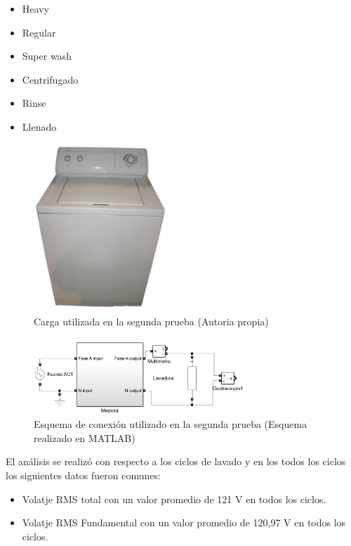 \begin{itemize}
  \itemsep0em
  \item Heavy
  \item Regular
  \item Super wash
  \item Centrifugado
  \item Rinse
  \item Llenado
\end{itemize}
\begin{figure}[H]
  \begin{center}
      \includegraphics[width = 5cm]{4Resultados/lavadora2.png}
      \caption{ Carga utilizada en la segunda prueba (Autoria propia)} 
      \label{fig:montaje2}
 \end{center}
\end{figure}
\begin{figure}[H]
  \begin{center}
      \includegraphics[width = 8cm]{4Resultados/conexion2.jpeg}
      \caption{ Esquema de conexión utilizado en la segunda prueba (Esquema realizado en MATLAB)} 
      \label{fig:conexion2}
 \end{center}
\end{figure}
El análisis se realizó con respecto a los ciclos de lavado y en los todos los ciclos los siguientes datos fueron comunes:

\begin{itemize}
  \itemsep0em
  \item Volatje RMS total con un valor promedio de 121 V en todos los ciclos.
  \item Volatje RMS Fundamental con un valor promedio de 120,97 V en todos los ciclos.
\end{itemize}

